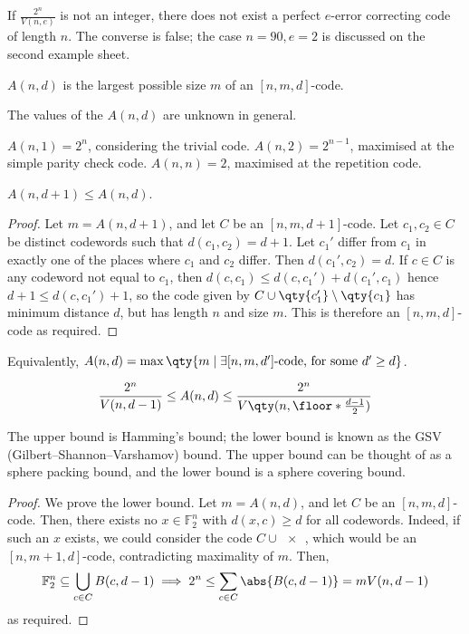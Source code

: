 \begin{remark}
    If $\frac{2^n}{V(n,e)}$ is not an integer, there does not exist a perfect $e$-error correcting code of length $n$.
    The converse is false; the case $n = 90, e = 2$ is discussed on the second example sheet.
\end{remark}
\begin{definition}
    $A(n,d)$ is the largest possible size $m$ of an $[n,m,d]$-code.
\end{definition}
The values of the $A(n,d)$ are unknown in general.
\begin{example}
    $A(n,1) = 2^n$, considering the trivial code.
    $A(n,2) = 2^{n-1}$, maximised at the simple parity check code.
    $A(n,n) = 2$, maximised at the repetition code.
\end{example}
\begin{lemma}
    $A(n,d+1) \leq A(n,d)$.
\end{lemma}
\begin{proof}
    Let $m = A(n,d+1)$, and let $C$ be an $[n,m,d+1]$-code.
    Let $c_1, c_2 \in C$ be distinct codewords such that $d(c_1,c_2) = d+1$.
    Let $c_1'$ differ from $c_1$ in exactly one of the places where $c_1$ and $c_2$ differ.
    Then $d(c_1', c_2) = d$.
    If $c \in C$ is any codeword not equal to $c_1$, then $d(c,c_1) \leq d(c,c_1') + d(c_1',c_1)$ hence $d + 1 \leq d(c,c_1') + 1$, so the code given by $C \cup \qty{c_1'} \setminus \qty{c_1}$ has minimum distance $d$, but has length $n$ and size $m$.
    This is therefore an $[n,m,d]$-code as required.
\end{proof}
\begin{corollary}
    Equivalently, $A(n,d) = \max \qty{m \mid \exists [n,m,d'] \text{-code, for some } d' \geq d}$.
\end{corollary}
\begin{theorem}
    \begin{align*}
        \frac{2^n}{V(n,d-1)} \leq A(n,d) \leq \frac{2^n}{V\qty(n,\floor*{\frac{d-1}{2}})}
    \end{align*}
\end{theorem}
The upper bound is Hamming's bound; the lower bound is known as the GSV (Gilbert--Shannon--Varshamov) bound.
The upper bound can be thought of as a sphere packing bound, and the lower bound is a sphere covering bound.
\begin{proof}
    We prove the lower bound.
    Let $m = A(n,d)$, and let $C$ be an $[n,m,d]$-code.
    Then, there exists no $x \in \mathbb F_2^n$ with $d(x,c) \geq d$ for all codewords.
    Indeed, if such an $x$ exists, we could consider the code $C \cup \qty{x}$, which would be an $[n,m+1,d]$-code, contradicting maximality of $m$.
    Then,
    \begin{align*}
        \mathbb F_2^n \subseteq \bigcup_{c \in C} B(c,d-1) \implies 2^n \leq \sum_{c \in C} \abs{B(c,d-1)} = mV(n,d-1)
    \end{align*}
    as required.
\end{proof}
